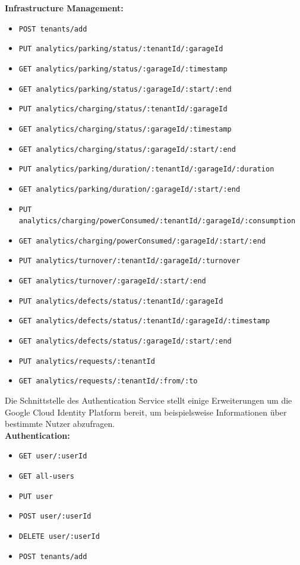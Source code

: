\textbf{Infrastructure Management:}
\begin{itemize}[noitemsep]
    \item[] \verb|POST tenants/add|
    \item[] \verb|PUT analytics/parking/status/:tenantId/:garageId|
    \item[] \verb|GET analytics/parking/status/:garageId/:timestamp|
    \item[] \verb|GET analytics/parking/status/:garageId/:start/:end|
    \item[] \verb|PUT analytics/charging/status/:tenantId/:garageId|
    \item[] \verb|GET analytics/charging/status/:garageId/:timestamp|
    \item[] \verb|GET analytics/charging/status/:garageId/:start/:end|
    \item[] \verb|PUT analytics/parking/duration/:tenantId/:garageId/:duration|
    \item[] \verb|GET analytics/parking/duration/:garageId/:start/:end|
    \item[] \verb|PUT analytics/charging/powerConsumed/:tenantId/:garageId/:consumption|
    \item[] \verb|GET analytics/charging/powerConsumed/:garageId/:start/:end|
    \item[] \verb|PUT analytics/turnover/:tenantId/:garageId/:turnover|
    \item[] \verb|GET analytics/turnover/:garageId/:start/:end|
    \item[] \verb|PUT analytics/defects/status/:tenantId/:garageId|
    \item[] \verb|GET analytics/defects/status/:tenantId/:garageId/:timestamp|
    \item[] \verb|GET analytics/defects/status/:garageId/:start/:end|
    \item[] \verb|PUT analytics/requests/:tenantId|
    \item[] \verb|GET analytics/requests/:tenantId/:from/:to|
\end{itemize}

Die Schnittstelle des Authentication Service stellt einige Erweiterungen um die Google Cloud Identity Platform bereit, um beispielsweise Informationen über bestimmte Nutzer abzufragen. \\

\textbf{Authentication:}
\begin{itemize}[noitemsep]
    \item[] \verb|GET user/:userId|
    \item[] \verb|GET all-users|
    \item[] \verb|PUT user|
    \item[] \verb|POST user/:userId|
    \item[] \verb|DELETE user/:userId|
    \item[] \verb|POST tenants/add|
\end{itemize}

